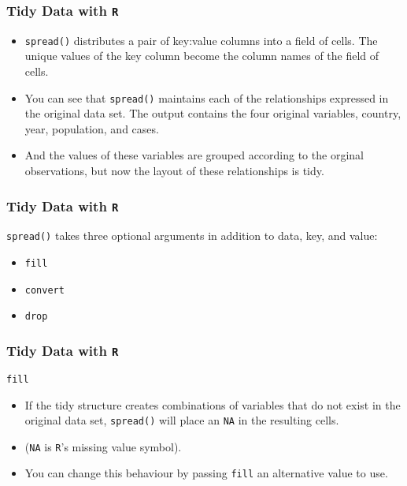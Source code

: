 \documentclass[TIDYMASTER.tex]{subfiles}
\begin{document}
\begin{frame}[fragile]
\frametitle{Tidy Data with \texttt{R}}
\Large
\begin{itemize}
\item \texttt{spread()} distributes a pair of key:value columns into a field of cells. The unique values of the key column become the column names of the field of cells.

\item You can see that \texttt{spread()} maintains each of the relationships expressed in the original data set. The output contains the four original variables, country, year, population, and cases.

\item And the values of these variables are grouped according to the orginal observations, but now the layout of these relationships is tidy.
\end{itemize}

\end{frame}
\begin{frame}[fragile]
	\frametitle{Tidy Data with \texttt{R}}
	\Large
\texttt{spread()} takes three optional arguments in addition to data, key, and value:
\begin{itemize}
	\item \texttt{fill}
	\item \texttt{convert}
	\item \texttt{drop}
\end{itemize}
\end{frame}
\begin{frame}[fragile]
	\frametitle{Tidy Data with \texttt{R}}
	\Large
\texttt{fill}
\begin{itemize}
	\item  If the tidy structure creates combinations of variables that do not exist in the original data set, \texttt{spread()} will place an \texttt{NA} in the resulting cells.
	\item (\texttt{NA} is \texttt{R}’s missing value symbol). 
	\item You can change this behaviour by passing \texttt{fill} an alternative value to use.
\end{itemize}
\end{frame}
\end{document}
